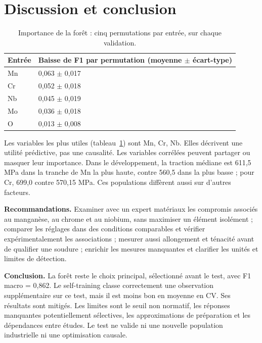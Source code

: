 \documentclass[10pt,a4paper]{article}
\begin{document}
\section{Discussion et conclusion}

\begin{table}[H]\centering\small
\begin{tabularx}{\linewidth}{lX}
\toprule
\textbf{Entrée} & \textbf{Baisse de F1 par permutation (moyenne \ensuremath{\pm} écart-type)} \\
\midrule
Mn & 0,063 \ensuremath{\pm} 0,017 \\
Cr & 0,052 \ensuremath{\pm} 0,018 \\
Nb & 0,045 \ensuremath{\pm} 0,019 \\
Mo & 0,036 \ensuremath{\pm} 0,018 \\
O & 0,013 \ensuremath{\pm} 0,008 \\
\bottomrule
\end{tabularx}
\caption{Importance de la forêt : cinq permutations par entrée, sur chaque validation.}\label{tab:importance}
\end{table}

Les variables les plus utiles (tableau~\ref{tab:importance}) sont Mn, Cr, Nb. Elles décrivent une utilité prédictive, pas une causalité. Les variables corrélées peuvent partager ou masquer leur importance. Dans le développement, la traction médiane est 611,5 MPa dans la tranche de Mn la plus haute, contre 560,5 dans la plus basse ; pour Cr, 699,0 contre 570,15 MPa. Ces populations diffèrent aussi sur d'autres facteurs.

\textbf{Recommandations.} Examiner avec un expert matériaux les compromis associés au manganèse, au chrome et au niobium, sans maximiser un élément isolément ; comparer les réglages dans des conditions comparables et vérifier expérimentalement les associations ; mesurer aussi allongement et ténacité avant de qualifier une soudure ; enrichir les mesures manquantes et clarifier les unités et limites de détection.

\textbf{Conclusion.} La forêt reste le choix principal, sélectionné avant le test, avec F1 macro = 0,862. Le self-training classe correctement une observation supplémentaire sur ce test, mais il est moins bon en moyenne en CV. Ses résultats sont mitigés. Les limites sont le seuil non normatif, les réponses manquantes potentiellement sélectives, les approximations de préparation et les dépendances entre études. Le test ne valide ni une nouvelle population industrielle ni une optimisation causale.
\end{document}
